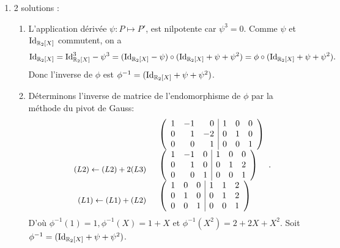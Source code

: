 \documentclass{book}
\begin{document}
\begin{enumerate}
\begin{enumerate}
\end{enumerate}
\item 2 solutions :
\begin{enumerate}
\item L'application dérivée $\psi:P\mapsto P'$, est nilpotente car $\psi^3=0$. Comme $\psi$ et $\mathrm{Id}_{\mathbb{R} _2[X]}$ commutent,
on a$$ \mathrm{Id}_{\mathbb{R} _2[X]}=\mathrm{Id}^3_{\mathbb{R} _2[X]}-\psi^3=(\mathrm{Id}_{\mathbb{R} _2[X]}-\psi)\circ(\mathrm{Id}_{\mathbb{R} _2[X]}+\psi+\psi^2)=\phi\circ (\mathrm{Id}_{\mathbb{R} _2[X]}+\psi+\psi^2).$$ Donc l'inverse de $\phi$ est $\phi^{-1}=(\mathrm{Id}_{\mathbb{R} _2[X]}+\psi+\psi^2)$.
\item  Déterminons l'inverse de matrice de l'endomorphisme de $\phi$ par la méthode du pivot de Gauss:
$$\begin{array}{rl}
&\left({\begin{array}{rrr|rrr}1 &-1&0&1&0&0\\0 &1&-2&0&1&0\\0&0&1&0&0&1 \end{array}}\right)\\
\begin{small}\begin{array}{r} \\(L2)\leftarrow (L2)+2(L3) \end{array}\end{small}&\left({\begin{array}{rrr|rrr}1 &-1&0&1&0&0\\0 &1&0&0&1&2\\0&0&1&0&0&1 \end{array}}\right)\\
\begin{small}\begin{array}{r} \\(L1)\leftarrow (L1)+(L2) \end{array}\end{small}&\left({\begin{array}{rrr|rrr}1 &0&0&1&1&2\\0 &1&0&0&1&2\\0&0&1&0&0&1 \end{array}}\right)
\end{array}.$$
D'où $\phi^{-1}(1)=1,\phi^{-1}(X)=1+X$ et $\phi^{-1}(X^2)=2+2X+X^2$.  Soit $\phi^{-1}=(\mathrm{Id}_{\mathbb{R} _2[X]}+\psi+\psi^2)$.
\end{enumerate}
\end{enumerate}
%
%
%
%
\end{document}
